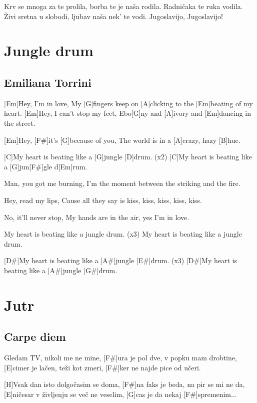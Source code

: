 \documentclass[a4paper,12pt]{article}
\begin{document}
\begin{multicols}{2}
\begin{guitar}
Krv se mnoga za te prolila,
borba te je naša rodila.
Radničaka te ruka vodila.
Živi sretna u slobodi,
ljubav naša nek' te vodi.
Jugoslavijo, Jugoslavijo!

\end{guitar}
\section{Jungle drum}
\subsection*{Emiliana Torrini}
\begin{guitar}
       
[Em]Hey, I'm in love,
My [G]fingers keep on [A]clicking to the 
[Em]beating of my heart.
[Em]Hey, I can't stop my feet,
Ebo[G]ny and [A]ivory and [Em]dancing in the street.

[Em]Hey, [F#]it's [G]because of you,
The world is in a [A]crazy, hazy [B]hue.


[C]My heart is beating like a [G]jungle [D]drum. (x2)
[C]My heart is beating like a [G]jun[F#]gle d[Em]rum.


Man, you got me burning,
I'm the moment between the 
striking and the fire.

Hey, read my lips,
Cause all they say is 
kiss, kiss, kiss, kiss, kiss.


No, it'll never stop,
My hands are in the air, yes I'm in love.


My heart is beating like a jungle drum. (x3)
My heart is beating like a jungle drum.


[D#]My heart is beating like a [A#]jungle [E#]drum. (x3)
[D#]My heart is beating like a [A#]jungle [G#]drum.


\end{guitar}
\section{Jutr}
\subsection*{Carpe diem}
\begin{guitar}
[H]Gledam TV, nikoli me ne mine,
[F#]ura je pol dve, v popku mam drobtine,
[E]cimer je lačen, teži kot zmeri,
[F#]ker ne najde pice od učeri.


[H]Vsak dan isto dolgočasim se doma,
[F#]na faks je beda, na pir se mi ne da,
[E]ničesar v življenju se več ne veselim,
[G]cas je da nekaj [F#]spremenim...



\end{guitar}
\end{multicols}
\end{document}

